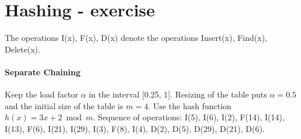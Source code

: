 \section*{Hashing - exercise}

The operations I(x), F(x), D(x) denote the operations Insert(x), Find(x), Delete(x).

\paragraph*{Separate Chaining}
Keep the load factor $\alpha$ in the interval [0.25, 1]. Resizing of the table puts $\alpha = 0.5$ and the initial size of the table is $m = 4$. Use the hash function $h(x) = 3x + 2 \bmod m$. Sequence of operations: I(5), I(6), I(2), F(14), I(14), I(13), F(6), I(21), I(29), I(3), F(8), I(4), D(2), D(5), D(29), D(21), D(6).

